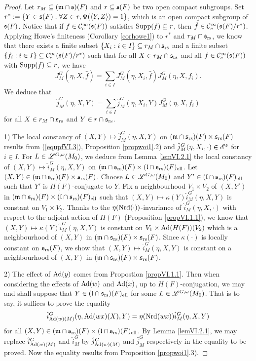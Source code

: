 \documentclass[a4paper]{amsart}
\newcommand{\mse}{\mathscr{E}}\newcommand{\msf}{\mathscr{F}}\newcommand{\msg}{\mathscr{G}}\newcommand{\msh}{\mathscr{H}}
\newcommand{\fm}{{\mathfrak{m}}} \newcommand{\fn}{{\mathfrak{n}}}\newcommand{\fo}{{\mathfrak{o}}} \newcommand{\fp}{{\mathfrak{p}}}
\theoremstyle{definition}
\theoremstyle{remark}
\numberwithin{equation}{subsection}
\begin{document}
\begin{proof}
Let $r_M\subseteq(\fm\cap\fs)(F)$ and $r\subseteq{\mathfrak{s}}(F)$ be two open compact subgroups. Set $r^\ast:=\{Y\in{\mathfrak{s}}(F): \forall Z\in r, \Psi(\langle Y,Z \rangle)=1\}$, which is an open compact subgroup of ${\mathfrak{s}}(F)$. Notice that if $f\in{\mathcal {C}}_c^\infty({\mathfrak{s}}(F))$ satisfies ${\mathrm{Supp}}(f)\subseteq r$, then $\hat{f}\in{\mathcal {C}}_c^\infty({\mathfrak{s}}(F)/r^\ast)$. Applying Howe's finiteness (Corollary \ref{corhowe1}) to $r^\ast$ and $r_M\cap{\mathfrak{s}}_{\mathrm{rs}}$, we know that there exists a finite subset $\{X_i: i\in I\}\subseteq r_M\cap{\mathfrak{s}}_{\mathrm{rs}}$ and a finite subset $\{f_i: i\in I\}\subseteq {\mathcal {C}}_c^\infty({\mathfrak{s}}(F)/r^\ast)$ such that for all $X\in r_M\cap{\mathfrak{s}}_{\mathrm{rs}}$ and all $f\in{\mathcal {C}}_c^\infty({\mathfrak{s}}(F))$ with ${\mathrm{Supp}}(f)\subseteq r$, we have
$$ J_M^G(\eta,X,\hat{f})=\sum_{i\in I} J_M^G(\eta,X_i,\hat{f}) J_M^G(\eta,X,f_i). $$
We deduce that
\begin{equation}\label{equpfVI.3}
 \hat{j}_M^G(\eta, X, Y)=\sum_{i\in I} \hat{j}_M^G(\eta, X_i, Y) J_M^G(\eta,X,f_i) 
\end{equation}
for all $X\in r_M\cap{\mathfrak{s}}_{\mathrm{rs}}$ and $Y\in r\cap{\mathfrak{s}}_{\mathrm{rs}}$. 

1) The local constancy of $(X,Y)\mapsto\hat{j}_M^G(\eta,X,Y)$ on $(\fm\cap\fs_\rs)(F)\times\fs_\rs(F)$ results from (\ref{equpfVI.3}), Proposition \ref{propwoi1}.2) and $\hat{j}_M^G(\eta, X_i, \cdot)\in\mse^\fs$ for $i\in I$. For $L\in\mathscr{L}^{G,\omega}(M_0)$, we deduce from Lemma \ref{lemVI.2.1} the local constancy of $(X, Y)\mapsto\hat{i}_M^G(\eta, X, Y)$ on $(\fm\cap\fs_\rs)(F)\times(\fl\cap\fs_\rs)(F)_\el$. Let $(X,Y)\in(\fm\cap\fs_\rs)(F)\times\fs_\rs(F)$. Choose $L\in\mathscr{L}^{G,\omega}(M_0)$ and $Y'\in({\mathfrak{l}}\cap{\mathfrak{s}}_{\mathrm{rs}})(F)_{\mathrm{ell}}$ such that $Y'$ is $H(F)$-conjugate to $Y$. Fix a neighbourhood $V_1\times V_2$ of $(X,Y')$ in $(\fm\cap\fs_\rs)(F)\times(\fl\cap\fs_\rs)(F)_\el$ such that $(X, Y)\mapsto\kappa(Y)\hat{i}_M^G(\eta, X, Y)$ is constant on $V_1\times V_2$. Thanks to the $\eta({\mathrm{Nrd}}(\cdot))$-invariance of $\hat{i}_M^G(\eta, X, \cdot)$ with respect to the adjoint action of $H(F)$ (Proposition \ref{propVI.1.1}), we know that $(X, Y)\mapsto\kappa(Y)\hat{i}_M^G(\eta, X, Y)$ is constant on $V_1\times {\mathrm{Ad}}(H(F))(V_2)$ which is a neighbourhood of $(X,Y)$ in $(\fm\cap\fs_\rs)(F)\times\fs_\rs(F)$. Since $\kappa(\cdot)$ is locally constant on ${\mathfrak{s}}_{\mathrm{rs}}(F)$, we show that $(X, Y)\mapsto\hat{i}_M^G(\eta, X, Y)$ is constant on a neighbourhood of $(X,Y)$ in $(\fm\cap\fs_\rs)(F)\times\fs_\rs(F)$. 

2) The effect of ${\mathrm{Ad}}(y)$ comes from Propostion \ref{propVI.1.1}. Then when considering the effects of ${\mathrm{Ad}}(w)$ and ${\mathrm{Ad}}(x)$, up to $H(F)$-conjugation, we may and shall suppose that $Y\in({\mathfrak{l}}\cap{\mathfrak{s}}_{\mathrm{rs}})(F)_{\mathrm{ell}}$ for some $L\in\mathscr{L}^{G,\omega}(M_0)$. That is to say, it suffices to prove the equality
$$ \hat{i}_{{\mathrm{Ad}}(w)(M)}^G(\eta, {\mathrm{Ad}}(wx)(X), Y)=\eta({\mathrm{Nrd}}(wx))\hat{i}_M^G(\eta, X, Y) $$
for all $(X, Y)\in(\fm\cap\fs_\rs)(F)\times(\fl\cap\fs_\rs)(F)_\el$. By Lemma \ref{lemVI.2.1}, we may replace $\hat{i}_{{\mathrm{Ad}}(w)(M)}^G$ and $\hat{i}_M^G$ by $\hat{j}_{{\mathrm{Ad}}(w)(M)}^G$ and $\hat{j}_M^G$ respectively in the equality to be proved. Now the equality results from Proposition \ref{propwoi1}.3). 


\end{proof}
\end{document}
